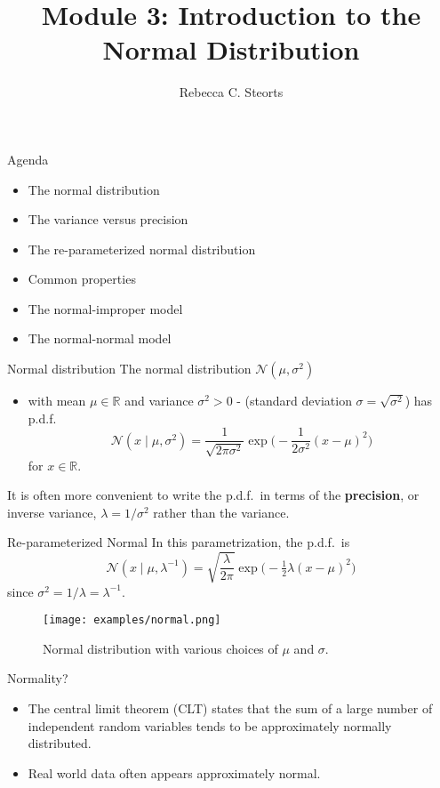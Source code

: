 \documentclass[
  ignorenonframetext,
]{beamer}
\title{Module 3: Introduction to the Normal Distribution}
\author{Rebecca C. Steorts}
\date{}
\providecommand{\tightlist}{%
  \setlength{\itemsep}{0pt}\setlength{\parskip}{0pt}}
\newcommand{\R}{\mathbb{R}}
\newcommand{\N}{\mathcal{N}}
\begin{document}
\frame{\titlepage}

\begin{frame}{Agenda}
\protect\hypertarget{agenda}{}
\begin{itemize}
\tightlist
\item
  The normal distribution
\item
  The variance versus precision
\item
  The re-parameterized normal distribution
\item
  Common properties
\item
  The normal-improper model
\item
  The normal-normal model
\end{itemize}
\end{frame}

\begin{frame}{Normal distribution}
\protect\hypertarget{normal-distribution}{}
The normal distribution \(\N(\mu,\sigma^2)\)

\begin{itemize}
\tightlist
\item
  with mean \(\mu\in\R\) and variance \(\sigma^2 > 0\) - (standard
  deviation \(\sigma =\sqrt{\sigma^2}\)) has p.d.f.
  \[\N(x\mid\mu,\sigma^2) =\frac{1}{\sqrt{2\pi\sigma^2}}\exp\Big(-\frac{1}{2\sigma^2}(x-\mu)^2\Big) \]
  for \(x\in\R\).
\end{itemize}

It is often more convenient to write the p.d.f.~in terms of the
\textbf{precision}, or inverse variance, \(\lambda = 1/\sigma^2\) rather
than the variance.
\end{frame}

\begin{frame}{Re-parameterized Normal}
\protect\hypertarget{re-parameterized-normal}{}
In this parametrization, the p.d.f.~is
\[\N(x\mid\mu,\lambda^{-1}) =\sqrt{\frac{\lambda}{2\pi}}\exp\big(-\tfrac{1}{2}\lambda (x-\mu)^2\big) \]
since \(\sigma^2 = 1/\lambda =\lambda^{-1}\).

\begin{figure}
  \begin{center}
    \texttt{[image: examples/normal.png]}
  \end{center}
  \caption{Normal distribution with various choices of $\mu$ and $\sigma$.}
\end{figure}
\end{frame}

\begin{frame}{Normality?}
\protect\hypertarget{normality}{}
\begin{itemize}
\tightlist
\item
  The central limit theorem (CLT) states that the sum of a large number
  of independent random variables tends to be approximately normally
  distributed.\\
\item
  Real world data often appears approximately normal.
\end{itemize}
\end{frame}
\end{document}

